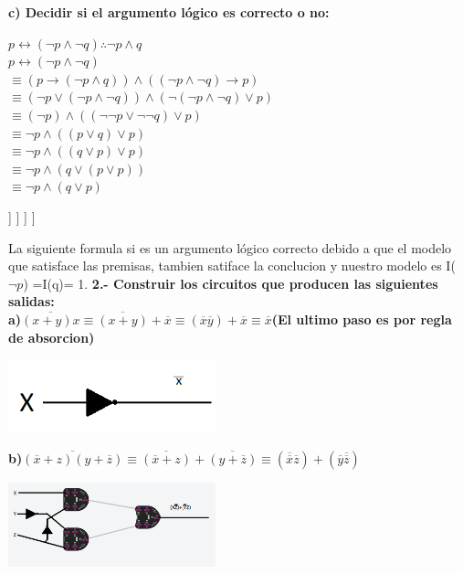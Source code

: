 \documentclass[paper=letter, fontsize=12pt]{scrartcl}
\begin{document}
{\bf c) Decidir si el argumento lógico es correcto o no:}\\
\begin{center}
$p\leftrightarrow (\neg p \wedge \neg q) \therefore \neg p\wedge q$\\
$p\leftrightarrow (\neg p\wedge \neg q)$\\
$\equiv (p\rightarrow (\neg p \wedge q)) \wedge ((\neg p \wedge \neg q)\rightarrow p)$\\
$\equiv (\neg p \vee (\neg p \wedge \neg q))\wedge (\neg(\neg p \wedge \neg q)\vee p)$\\
$\equiv (\neg p)\wedge ((\neg \neg p \vee \neg \neg q)\vee p )$\\
$\equiv \neg p \wedge ((p\vee q)\vee p)$\\
$\equiv \neg p \wedge ((q\vee p)\vee p)$\\
$\equiv \neg p \wedge (q\vee (p\vee p))$\\
$\equiv \neg p \wedge (q\vee p)$\\

\begin{forest}
[$\neg p \wedge (q\vee p)$
	[$\neg p$
		[$q\vee p$
			[$q$]
			[$p$
				[cancelado]
			]
		]
	]
]
\end{forest}
\end{center}
La siguiente formula si es un argumento lógico correcto debido a que el modelo que satisface las premisas, tambien satiface la conclucion y nuestro modelo es I($\neg p$) =I(q)= 1.
{\Large{\bf 2.- Construir los circuitos que producen las siguientes salidas:}}\\
{\bf a)$\overline{(x+y)x} \equiv \overline{(x+y)} +\overline{x} \equiv (\overline{x}\overline{y})+\overline{x} \equiv \overline{x} $(El ultimo paso es por regla de absorcion)}\\
	\begin{center}                  
      \includegraphics[width=6cm]{img/circuito1.png}
    \end{center}
{\bf b)$\overline{(\overline{x}+z)(y+\overline{z})} \equiv \overline{(\overline{x}+z)}+\overline{(y+\overline{z})} \equiv (\overline{\overline{x}}\overline{z})+(\overline{y}\overline{\overline{z}})$}
\begin{center}                  
      \includegraphics[width=6cm]{img/circuito2.png}
    \end{center}
\end{document}
